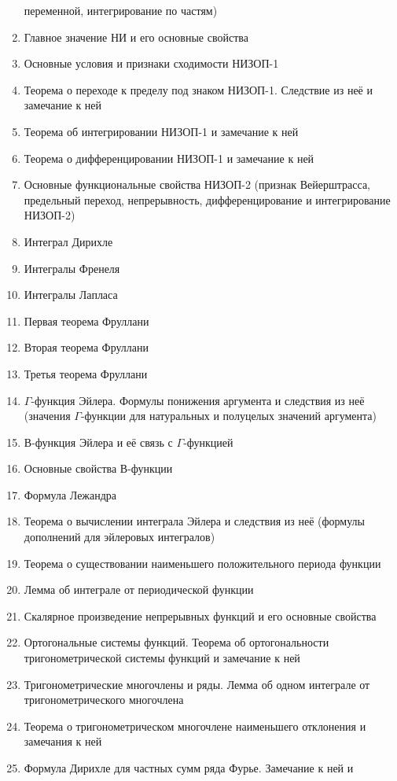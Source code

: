 \documentclass[../main.tex]{subfiles}
\begin{document}
\begin{enumerate}
    переменной, интегрирование по частям)
    \item Главное значение НИ и его основные свойства
    \item Основные условия и признаки сходимости НИЗОП-1
    \item Теорема о переходе к пределу под знаком НИЗОП-1. Следствие из неё и 
    замечание к ней
    \item Теорема об интегрировании НИЗОП-1 и замечание к ней
    \item Теорема о дифференцировании НИЗОП-1 и замечание к ней
    \item Основные функциональные свойства НИЗОП-2 (признак Вейерштрасса, 
    предельный переход, непрерывность, дифференцирование и интегрирование 
    НИЗОП-2)
    \item Интеграл Дирихле
    \item Интегралы Френеля
    \item Интегралы Лапласа
    \item Первая теорема Фруллани
    \item Вторая теорема Фруллани
    \item Третья теорема Фруллани
    \item $\Gamma$-функция Эйлера. Формулы понижения аргумента и следствия из 
    неё (значения $\Gamma$-функции для натуральных и полуцелых значений 
    аргумента)
    \item В-функция Эйлера и её связь с $\Gamma$-функцией
    \item Основные свойства В-функции
    \item Формула Лежандра
    \item Теорема о вычислении интеграла Эйлера и следствия из неё (формулы 
    дополнений для эйлеровых интегралов)
    \item Теорема о существовании наименьшего положительного периода функции
    \item Лемма об интеграле от периодической функции
    \item Скалярное произведение непрерывных функций и его основные свойства
    \item Ортогональные системы функций. Теорема об ортогональности 
    тригонометрической системы функций и замечание к ней
    \item Тригонометрические многочлены и ряды. Лемма об одном интеграле от 
    тригонометрического многочлена
    \item Теорема о тригонометрическом многочлене наименьшего отклонения и 
    замечания к ней
    \item Формула Дирихле для частных сумм ряда Фурье. Замечание к ней и 

\end{enumerate}
\end{document}
